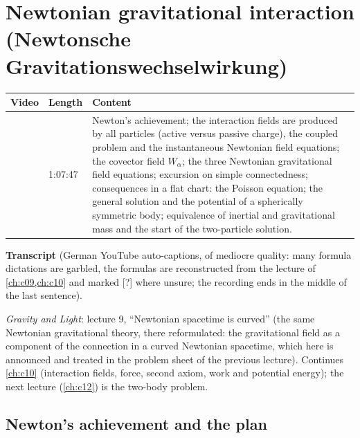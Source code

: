 \chapter{Newtonian gravitational interaction (Newtonsche Gravitationswechselwirkung)}\label{ch:c11}
\begin{paracol}{2}

\begin{sources}
\begin{tabularx}{\linewidth}{@{}l l L@{}}
\toprule
\textbf{Video} & \textbf{Length} & \textbf{Content}\\
\midrule
{} & 1:07:47 & Newton's achievement; the interaction fields are produced by all particles (active versus passive charge), the coupled problem and the instantaneous Newtonian field equations;
the covector field $W_\alpha$; the three Newtonian gravitational field equations; excursion on simple connectedness; consequences in a flat chart: the Poisson equation; the general solution and the potential of a spherically symmetric body; equivalence of inertial and gravitational mass and the start of the two-particle solution.\\
\bottomrule
\end{tabularx}

\smallskip
\textbf{Transcript}  (German YouTube auto-captions, of mediocre quality: many formula dictations are garbled, the formulas are reconstructed from the lecture of \cref{ch:c09,ch:c10}
and marked [?] where unsure; the recording ends in the middle of the last sentence).
\end{sources}

\begin{reading}
\emph{Gravity and Light}: lecture 9, ``Newtonian spacetime is curved'' (the same Newtonian gravitational theory, there reformulated: the gravitational field as a component of the connection in a curved Newtonian spacetime, which here is announced and treated in the problem sheet of the previous lecture).
Continues \cref{ch:c10} (interaction fields, force, second axiom, work and potential energy); the next lecture (\cref{ch:c12}) is the two-body problem.
\end{reading}

\section{Newton's achievement and the plan}\label{sec:ng-plan}


\end{paracol}
